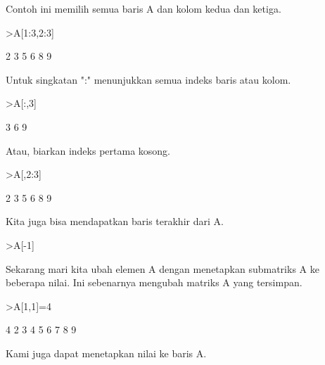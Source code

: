 \documentclass[a4paper,10pt]{article}
\begin{document}
\begin{eulernotebook}
\begin{eulercomment}
\begin{eulercomment}
\begin{eulercomment}
\begin{eulercomment}
\begin{eulercomment}
\begin{eulercomment}
\begin{eulercomment}
Contoh ini memilih semua baris A dan kolom kedua dan ketiga.
\end{eulercomment}
\begin{eulerprompt}
>A[1:3,2:3]
\end{eulerprompt}
\begin{euleroutput}
              2             3 
              5             6 
              8             9 
\end{euleroutput}
\begin{eulercomment}
Untuk singkatan ":" menunjukkan semua indeks baris atau kolom.
\end{eulercomment}
\begin{eulerprompt}
>A[:,3]
\end{eulerprompt}
\begin{euleroutput}
              3 
              6 
              9 
\end{euleroutput}
\begin{eulercomment}
Atau, biarkan indeks pertama kosong.
\end{eulercomment}
\begin{eulerprompt}
>A[,2:3]
\end{eulerprompt}
\begin{euleroutput}
              2             3 
              5             6 
              8             9 
\end{euleroutput}
\begin{eulercomment}
Kita juga bisa mendapatkan baris terakhir dari A.
\end{eulercomment}
\begin{eulerprompt}
>A[-1]
\end{eulerprompt}
\begin{euleroutput}
  [7,  8,  9]
\end{euleroutput}
\begin{eulercomment}
Sekarang mari kita ubah elemen A dengan menetapkan submatriks A ke
beberapa nilai. Ini sebenarnya mengubah matriks A yang tersimpan.
\end{eulercomment}
\begin{eulerprompt}
>A[1,1]=4
\end{eulerprompt}
\begin{euleroutput}
              4             2             3 
              4             5             6 
              7             8             9 
\end{euleroutput}
\begin{eulercomment}
Kami juga dapat menetapkan nilai ke baris A.

\end{eulercomment}
\end{eulercomment}
\end{eulercomment}
\end{eulercomment}
\end{eulercomment}
\end{eulercomment}
\end{eulercomment}
\end{eulernotebook}
\end{document}
